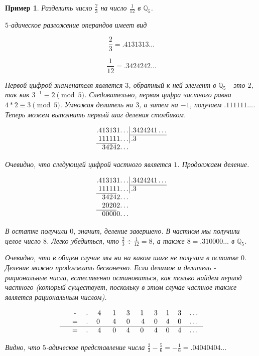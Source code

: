 \documentclass[master, och, diploma, times]{sty/SCWorks}
\theoremstyle{plain}
\newtheorem{exmp}{Пример}[section]
\theoremstyle{definition}
\numberwithin{equation}{section}
\begin{document}
\begin{exmp}
Разделить число $\frac{2}{3}$ на число $\frac{1}{12}$ в $\mathbb{Q}_5$.

\noindent $5$-адическое разложение операндов имеет вид

$$
\frac{2}{3}=.4131313\dots
$$

$$
\frac{1}{12}=.3424242\dots
$$

\noindent Первой цифрой знаменателя является $3$, обратный к ней элемент в $\mathbb{Q}_5$ - это $2$, так как $3^{-1} \equiv 2 \pmod 5$. Следовательно, первая цифра частного равна \mbox{$4*2 \equiv 3 \pmod 5$}. Умножая делитель на $3$, а затем на $-1$, получаем $.111111\dots$. Теперь можем выполнить первый шаг деления столбиком.

$$
\arraycolsep=0.01em
\begin{array}{rrrrrrrr@{\,}r|l}
.&4&1&3&1&3&1&\dots&&\,.3424241\dots\\
\cline{10-10}
&1&1&1&1&1&1&\dots&&\,.3\\
\cline{1-6}
&&3&4&2&4&2&\dots
\end{array}
$$

\noindent Очевидно, что следующей цифрой частного является $1$. Продолжаем деление.

$$
\arraycolsep=0.01em
\begin{array}{rrrrrrrr@{\,}r|l}
.&4&1&3&1&3&1&\dots&&\,.3424241\dots\\
\cline{10-10}
&1&1&1&1&1&1&\dots&&\,.3\\
\cline{1-6}
&&3&4&2&4&2&\dots \\
&&2&0&2&0&2&\dots \\
\cline{1-6}
&&0&0&0&0&0&\dots
\end{array}
$$

\noindent В остатке получили $0$, значит, деление завершено. В частном мы получили целое число $8$. Легко убедиться, что $\frac{2}{3} \div \frac{1}{12}=8$, а также $8=.310000\dots$ в $\mathbb{Q}_5$.

Очевидно, что в общем случае мы ни на каком шаге не получим в остатке $0$. Деление можно продолжать бесконечно. Если делимое и делитель - рациональные числа, естественно остановиться, как только найдем период частного (который существует, поскольку в этом случае частное также является рациональным числом).

$$
\begin{tabular}{cccccccccccc}
& - & . & 4\; & 1\; & 3\; & 1\; & 3 & 1 & 3 & \dots \\
& = & . & 0 \; & 4\; & 0\; & 4 & 0 & 4 & 0 & \dots \\
\hline
& = & . & 4\; & 0\; & 4\; & 0\; & 4 & 0 & 4 & \dots
\end{tabular}
$$

\noindent Видно, что $5$-адическое представление числа $\frac{2}{3} - \frac{5}{6}=-\frac{1}{6}=.04040404\dots$
\end{exmp}
\end{document}
